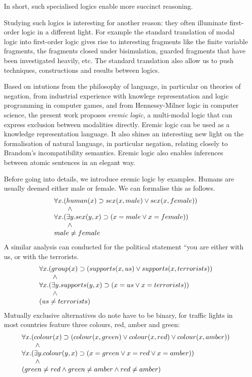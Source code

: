 \NI In short, such specialised logics enable more succinct reasoning.

Studying such logics is interesting for another reason: they often
illuminate first-order logic in a different light. For example the
standard translation of modal logic into first-order logic gives rise
to interesting fragments like the finite variable fragments, the
fragments closed under bisimulation, guarded fragments that have been
investigated heavily, etc. The standard translation also allow us to
push techniques, constructions and results between logics.

Based on intutions from the philosophy of language, in particular on
theories of negation, from industrial experience with knowlege
representation and logic programming in computer games, and from
Hennessy-Milner logic in computer science, the present work proposes
\emph{eremic logic}, a multi-modal logic that can express exclusion
between modalities directly. Eremic logic can be used as a knowledge
representation language.  It also shines an interesting new light on
the formalisation of natural language, in particular negation,
relating closely to Brandom's incompatibility semantics. Eremic logic
also enables inferences between atomic sentences in an elegant way.

Before going into details, we introduce eremic logic by examples.  
Humans are usually deemed  either male or female. We can formalise this
as follows.
\[
   \begin{array}{l}
   \forall x. (human(x) \supset sex(x, male) \lor sex(x, female)) \\
   \qquad\land        \\
   \forall x.( \exists y.sex(y, x) \supset ( x = male \lor x = female )) \\
   \qquad\land \\
   male \neq female
   \end{array}
\]
A similar analysis can conducted for the political statement ``you are
either with us, or with the terrorists.
\[
   \begin{array}{l}
   \forall x.(group(x) \supset ( supports(x, us) \lor supports(x, terrorists)) \\
   \qquad\land\\
   \forall x.( \exists y.supports(y, x) \supset ( x = us \lor x = terrorists )) \\
   \qquad\land\\
   ( us \neq terrorists)
   \end{array}
\]
Mutually exclusive alternatives do note have to be binary, for traffic
lights in most countries feature three colours, red, amber and green:
\[
   \begin{array}{l}
   \forall x.(colour(x) \supset ( colour(x, green) \lor colour(x, red) \lor colour(x, amber)) \\
   \qquad\land\\
   \forall x.( \exists y.colour(y, x) \supset ( x = green \lor x = red \lor x = amber )) \\
   \qquad\land\\
   ( green \neq red \land green \neq amber \land red \neq amber)
   \end{array}
\]


